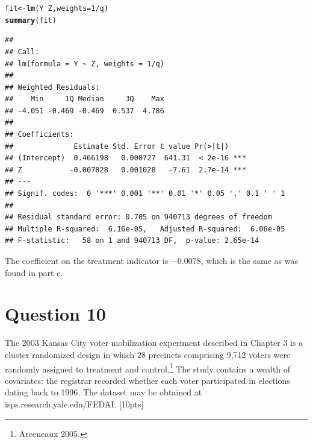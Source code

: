\documentclass[11pt,notitlepage]{article}\usepackage[]{graphicx}\usepackage[]{color}
\makeatletter
\newcommand{\hlnum}[1]{\textcolor[rgb]{0.686,0.059,0.569}{#1}}%
\newcommand{\hlopt}[1]{\textcolor[rgb]{0,0,0}{#1}}%
\newcommand{\hlstd}[1]{\textcolor[rgb]{0.345,0.345,0.345}{#1}}%
\newcommand{\hlkwb}[1]{\textcolor[rgb]{0.69,0.353,0.396}{#1}}%
\newcommand{\hlkwc}[1]{\textcolor[rgb]{0.333,0.667,0.333}{#1}}%
\newcommand{\hlkwd}[1]{\textcolor[rgb]{0.737,0.353,0.396}{\textbf{#1}}}%
\newenvironment{kframe}{%
 \def\at@end@of@kframe{}%
 \ifinner\ifhmode%
  \def\at@end@of@kframe{\end{minipage}}%
  \begin{minipage}{\columnwidth}%
 \fi\fi%
 \def\FrameCommand##1{\hskip\@totalleftmargin \hskip-\fboxsep
 \colorbox{shadecolor}{##1}\hskip-\fboxsep
     \hskip-\linewidth \hskip-\@totalleftmargin \hskip\columnwidth}%
 \MakeFramed {\advance\hsize-\width
   \@totalleftmargin\z@ \linewidth\hsize
   \@setminipage}}%
 {\par\unskip\endMakeFramed%
 \at@end@of@kframe}
\newenvironment{knitrout}{}{} %
\makeatother
\begin{document}
\begin{enumerate}[a)]
\begin{knitrout}
\begin{kframe}
\begin{alltt}
\hlstd{fit} \hlkwb{<-} \hlkwd{lm}\hlstd{(Y} \hlopt{~} \hlstd{Z,} \hlkwc{weights}\hlstd{=}\hlnum{1}\hlopt{/}\hlstd{q)}
\hlkwd{summary}\hlstd{(fit)}
\end{alltt}
\begin{verbatim}
## 
## Call:
## lm(formula = Y ~ Z, weights = 1/q)
## 
## Weighted Residuals:
##    Min     1Q Median     3Q    Max 
## -4.051 -0.469 -0.469  0.537  4.786 
## 
## Coefficients:
##              Estimate Std. Error t value Pr(>|t|)    
## (Intercept)  0.466198   0.000727  641.31  < 2e-16 ***
## Z           -0.007828   0.001028   -7.61  2.7e-14 ***
## ---
## Signif. codes:  0 '***' 0.001 '**' 0.01 '*' 0.05 '.' 0.1 ' ' 1
## 
## Residual standard error: 0.705 on 940713 degrees of freedom
## Multiple R-squared:  6.16e-05,	Adjusted R-squared:  6.06e-05 
## F-statistic:   58 on 1 and 940713 DF,  p-value: 2.65e-14
\end{verbatim}
\end{kframe}
\end{knitrout}

The coefficient on the treatment indicator is \ensuremath{-0.0078}, which is the same as was found in part c.

\end{enumerate}


\section*{Question 10}


The 2003 Kansas City voter mobilization experiment described in Chapter 3 is a cluster randomized design in which 28 precincts comprising 9,712 voters were randomly assigned to treatment and control.\footnote{Arceneaux 2005.} The study contains a wealth of covariates: the registrar recorded whether each voter participated in elections dating back to 1996.  The dataset may be obtained at isps.research.yale.edu/FEDAI. [10pts]
\end{document}
